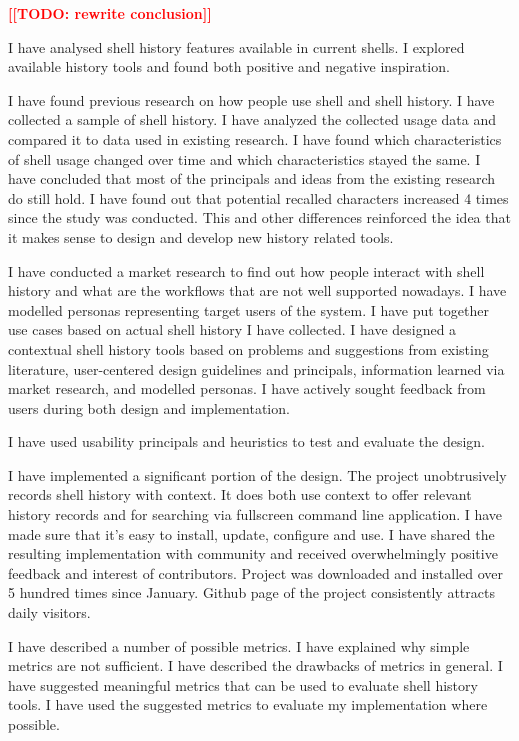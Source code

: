 \documentclass[thesis=M,english]{FITthesis}[2012/10/20]
\newcommand{\todotext}[1]{\textcolor{red}{\textbf{[[#1]]}}}
\begin{document}
\begin{conclusion}

\todotext{TODO: rewrite conclusion}

I have analysed shell history features available in current shells. I explored available history tools and found both positive and negative inspiration.

\par I have found previous research on how people use shell and shell history.  
I have collected a sample of shell history. I have analyzed the collected usage data and compared it to data used in existing research. I have found which characteristics of shell usage changed over time and which characteristics stayed the same. I have concluded that most of the principals and ideas from the existing research do still hold. I have found out that potential recalled characters increased 4 times since the study was conducted. This and other differences reinforced the idea that it makes sense to design and develop new history related tools. 

\par I have conducted a market research to find out how people interact with shell history and what are the workflows that are not well supported nowadays. I have modelled personas representing target users of the system. I have put together use cases based on actual shell history I have collected.
I have designed a contextual shell history tools based on problems and suggestions from existing literature, user-centered design guidelines and principals, information learned via market research, and modelled personas.
I have actively sought feedback from users during both design and implementation. 

I have used usability principals and heuristics to test and evaluate the design.

\par I have implemented a significant portion of the design. The project unobtrusively records shell history with context. It does both use context to offer relevant history records and for searching via fullscreen command line application.
I have made sure that it's easy to install, update, configure and use. I have shared the resulting implementation with community and received overwhelmingly positive feedback and interest of contributors. Project was downloaded and installed over 5 hundred times since January. Github page of the project consistently attracts daily visitors.  

\par I have described a number of possible metrics. I have explained why simple metrics are not sufficient. I have described the drawbacks of metrics in general. I have suggested meaningful metrics that can be used to evaluate shell history tools. I have used the suggested metrics to evaluate my implementation where possible. 


\end{conclusion}
\end{document}
